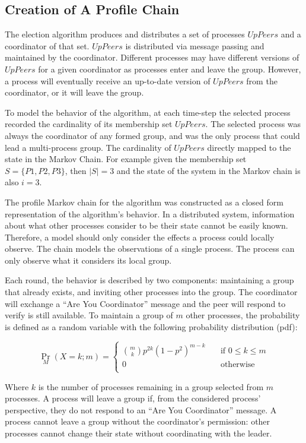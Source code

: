 \subsection{Creation of A Profile Chain}

The election algorithm produces and distributes a set of processes $UpPeers$ and a coordinator of that set.
$UpPeers$ is distributed via message passing and maintained by the coordinator.
Different processes may have different versions of $UpPeers$ for a given coordinator as processes enter and leave the group.
However, a process will eventually receive an up-to-date version of $UpPeers$ from the coordinator, or it will leave the group.

To model the behavior of the algorithm, at each time-step the selected process recorded the cardinality of its membership set $UpPeers$.
The selected process was always the coordinator of any formed group, and was the only process that could lead a multi-process group.
The cardinality of $UpPeers$ directly mapped to the state in the Markov Chain.
For example given the membership set $S=\{P1,P2,P3\}$, then $\left | S \right |=3$ and the state of the system in the Markov chain is also $i=3$.

The profile Markov chain for the algorithm was constructed as a closed form representation of the algorithm's behavior.
In a distributed system, information about what other processes consider to be their state cannot be easily known.
Therefore, a model should only consider the effects a process could locally observe.
The chain models the observations of a single process.
The process can only observe what it considers its local group.

Each round, the behavior is described by two components: maintaining a group that already exists, and inviting other processes into the group.
The coordinator will exchange a ``Are You Coordinator'' message and the peer will respond to verify is still available.
To maintain a group of $m$ other processes, the probability is defined as a random variable with the following probability distribution (pdf):

\[
 \Pr_{M}(X=k; m) = 
   \begin{cases}
    \binom{m}{k} p^{2k}(1-p^2)^{m-k} & \quad \text{if } 0 \leq k \leq m \\
    0                                & \quad \text{otherwise} \\
  \end{cases}
\]

Where $k$ is the number of processes remaining in a group selected from $m$ processes.
A process will leave a group if, from the considered process' perspective, they do not respond to an ``Are You Coordinator'' message.
A process cannot leave a group without the coordinator's permission: other processes cannot change their state without coordinating with the leader.

